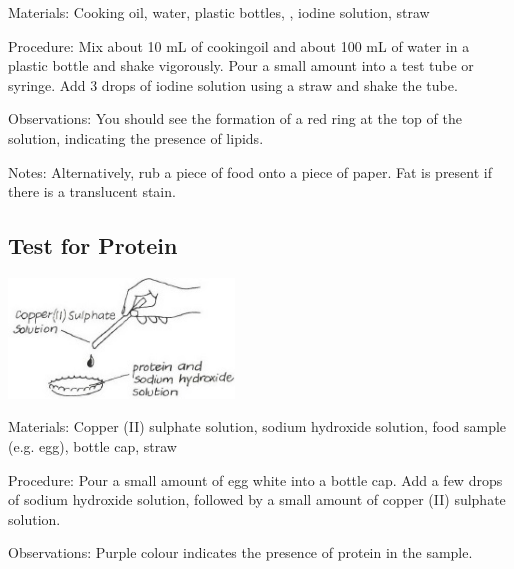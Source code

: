 \begin{multicols}{2}
\begin{description*}
\item[Materials:]{Cooking oil, water, plastic bottles, , iodine solution, straw}
\item[Procedure:]{Mix about 10 mL of cookingoil and about 100 mL of water in a plastic bottle and shake vigorously. Pour a small amount into a test tube or syringe. Add 3 drops of iodine solution using a straw and shake the tube.}
\item[Observations:]{You should see the formation of a red ring at the top of the solution, indicating the presence of lipids.}
\item[Notes:]{Alternatively, rub a piece of food onto a piece of paper. Fat is present if there is a translucent stain.}
\end{description*}

\columnbreak

\subsection{Test for Protein}  %

\begin{center}
\includegraphics[width=0.45\textwidth]{./img/vso/food-test-protein.jpg}
\end{center}

\begin{description*}
\item[Materials:]{Copper (II) sulphate solution, sodium hydroxide solution, food sample (e.g. egg), bottle cap, straw}
\item[Procedure:]{Pour a small amount of egg white into a bottle cap. Add a few drops of sodium hydroxide solution, followed by a small amount of copper (II) sulphate solution.}
\item[Observations:]{Purple colour indicates the presence of protein in the sample.}
\end{description*}


\end{multicols}
